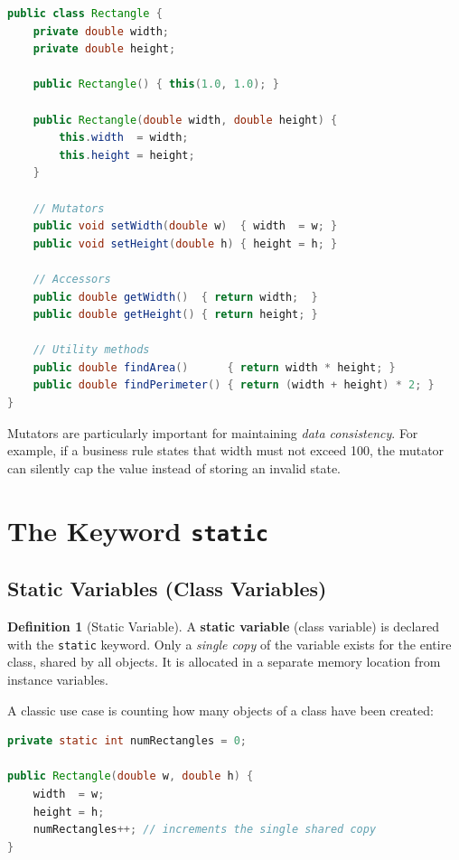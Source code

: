 \documentclass[11pt, a4paper, notitlepage]{report}
\theoremstyle{definition}
\newtheorem{definition}[theorem]{Definition}
\theoremstyle{remark}
\theoremstyle{definition}
\begin{document}
\begin{lstlisting}[language=Java, caption={Rectangle with accessors and mutators}]
public class Rectangle {
    private double width;
    private double height;

    public Rectangle() { this(1.0, 1.0); }

    public Rectangle(double width, double height) {
        this.width  = width;
        this.height = height;
    }

    // Mutators
    public void setWidth(double w)  { width  = w; }
    public void setHeight(double h) { height = h; }

    // Accessors
    public double getWidth()  { return width;  }
    public double getHeight() { return height; }

    // Utility methods
    public double findArea()      { return width * height; }
    public double findPerimeter() { return (width + height) * 2; }
}
\end{lstlisting}

Mutators are particularly important for maintaining \emph{data consistency}. For example, if a business rule states that width must not exceed 100, the mutator can silently cap the value instead of storing an invalid state.

\section{The Keyword \texttt{static}}
\label{sec:ch2-static}

\subsection{Static Variables (Class Variables)}
\label{sec:ch2-static-variables}

\begin{definition}[Static Variable]
\label{def:ch2-static-variable}
A \textbf{static variable} (class variable) is declared with the \texttt{static} keyword. Only a \emph{single copy} of the variable exists for the entire class, shared by all objects. It is allocated in a separate memory location from instance variables.
\end{definition}

A classic use case is counting how many objects of a class have been created:

\begin{lstlisting}[language=Java]
private static int numRectangles = 0;

public Rectangle(double w, double h) {
    width  = w;
    height = h;
    numRectangles++; // increments the single shared copy
}
\end{lstlisting}
\end{document}

